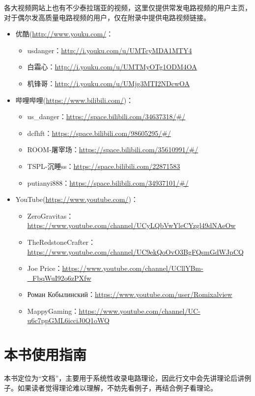 各大视频网站上也有不少泰拉瑞亚的视频，这里仅提供常发电路视频的用户主页，对于偶尔发高质量电路视频的用户，仅在附录中提供电路视频链接。
\begin{itemize}
\item 优酷(\url{http://www.youku.com/}：
\begin{itemize}
\item usdanger：\url{http://i.youku.com/u/UMTcyMDA1MTY4}
\item 白霜心：\url{http://i.youku.com/u/UMTMyOTg1ODM4OA}
\item 机锋哥：\url{http://i.youku.com/u/UMjg3MTI2NDcwOA}
\end{itemize}
\item 哔哩哔哩(\url{https://www.bilibili.com/})：
\begin{itemize}
\item us\_danger：\url{https://space.bilibili.com/34637318/#/}
\item dcfhft：\url{https://space.bilibili.com/98605295/#/}
\item ROOM-屠宰场：\url{https://space.bilibili.com/35610991/#/}
\item TSPL-沉睡ss：\url{https://space.bilibili.com/22871583}
\item putianyi888：\url{https://space.bilibili.com/34937101/#/}
\end{itemize}
\item YouTube(\url{https://www.youtube.com/})：
\begin{itemize}
\item ZeroGravitas：\url{https://www.youtube.com/channel/UCyLQbVwYleCYzgl49dNAeOw}
\item TheRedstoneCrafter：\url{https://www.youtube.com/channel/UC9ekQoOvO3BgFQsmGdWJpCQ}
\item Joe Price：\url{https://www.youtube.com/channel/UCllYBm-_FbqWuI92o6zPXfw}
\item Роман Кобылинский：\url{https://www.youtube.com/user/Romixalview}
\item MappyGaming：\url{https://www.youtube.com/channel/UC-u6c7ppGML6icciJ0Q1oWQ}
\end{itemize}
\end{itemize}

\section{本书使用指南}
本书定位为“文档”，主要用于系统性收录电路理论，因此行文中会先讲理论后讲例子。如果读者觉得理论难以理解，不妨先看例子，再结合例子看理论。

